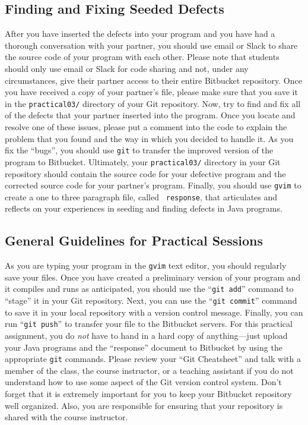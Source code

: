 \vspace*{-.15in}
\subsection*{Finding and Fixing Seeded Defects}
\vspace*{-.075in}

After you have inserted the defects into your program and you have had a thorough conversation with your partner, you
should use email or Slack to share the source code of your program with each other. Please note that students should
only use email or Slack for code sharing and not, under any circumstances, give their partner access to their entire
Bitbucket repository. Once you have received a copy of your partner's file, please make sure that you save it in the
{\tt practical03/} directory of your Git repository. Now, try to find and fix all of the defects that your partner
inserted into the program. Once you locate and resolve one of these issues, please put a comment into the code to
explain the problem that you found and the way in which you decided to handle it. As you fix the ``bugs'', you should
use {\tt git} to transfer the improved version of the program to Bitbucket. Ultimately, your {\tt practical03/}
directory in your Git repository should contain the source code for your defective program and the corrected source code
for your partner's program. Finally, you should use {\tt gvim} to create a one to three paragraph file, called {\tt
response}, that articulates and reflects on your experiences in seeding and finding defects in Java programs.

\vspace*{-.15in}
\subsection*{General Guidelines for Practical Sessions}
\vspace*{-.075in}

As you are typing your program in the {\tt gvim} text editor, you should regularly save your files.  Once you have
created a preliminary version of your program and it compiles and runs as anticipated, you should use the ``{\tt git
add}'' command to ``stage'' it in your Git repository.  Next, you can use the ``{\tt git commit}'' command to save it in
your local repository with a version control message.  Finally, you can run ``{\tt git push}'' to transfer your file to
the Bitbucket servers.  For this practical assignment, you do {\em not} have to hand in a hard copy of anything---just
upload your Java programs and the ``response'' document to Bitbucket by using the appropriate {\tt git} commands.
Please review your ``Git Cheatsheet'' and talk with a member of the class, the course instructor, or a teaching
assistant if you do not understand how to use some aspect of the Git version control system. Don't forget that it is
extremely important for you to keep your Bitbucket repository well organized. Also, you are responsible for ensuring
that your repository is shared with the course instructor.

